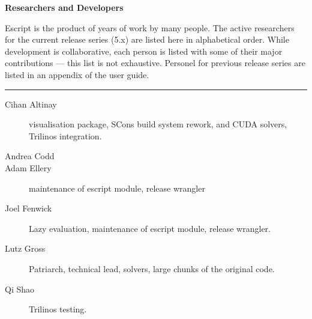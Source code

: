 
%
%
%

\vbox{}
\vfill
\begin{center}
\textbf{\Large Researchers and Developers}
\vspace{0.5cm}

Escript is the product of years of work by many people.
The active researchers for the current release series (5.x) are listed
here in alphabetical order.
While development is collaborative, each person is listed with some of their
major contributions --- this list is not exhaustive.
Personel for previous release series are listed in an appendix of the user
guide.

\vspace{1cm}
\hrule
\vspace{1cm}
\begin{description}
\item[Cihan Altinay] \weipa visualisation package, SCons build system rework, \ripley and CUDA solvers, Trilinos integration.
\item[Andrea Codd] 
\item[Adam Ellery] maintenance of escript module, release wrangler
\item[Joel Fenwick] Lazy evaluation, maintenance of escript module, release wrangler.
\item[Lutz Gross] Patriarch, technical lead, solvers, large chunks of the original code.
\item[Qi Shao] Trilinos testing.
\end{description}
\end{center}
\vfill
\pagebreak

